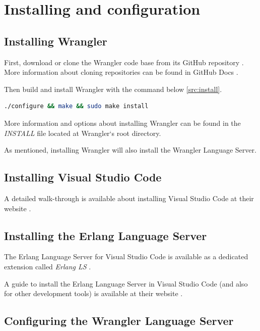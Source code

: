 \section{Installing and configuration}

\subsection{Installing Wrangler}

First, download or clone the Wrangler code base from its GitHub repository \cite{WranglerGitHub}. More information about cloning repositories can be found in GitHub Docs \cite{GitCloneTutorial}.

Then build and install Wrangler with the command below \ref{src:install}.

\begin{lstlisting}[language=bash]
  ./configure && make && sudo make install
\end{lstlisting}

More information and options about installing Wrangler can be found in the \emph{INSTALL} file located at Wrangler`s root directory.

As mentioned, installing Wrangler will also install the Wrangler Language Server.

\subsection{Installing Visual Studio Code}

A detailed walk-through is available about installing Visual Studio Code at their website \cite{VSCodeDownload}.

\subsection{Installing the Erlang Language Server}

The Erlang Language Server for Visual Studio Code is available as a dedicated extension called \emph{Erlang LS} \cite{ELSExtension}.

A guide to install the Erlang Language Server in Visual Studio Code (and also for other development tools) is available at their website \cite{ELSInstall}.

\subsection{Configuring the Wrangler Language Server}

